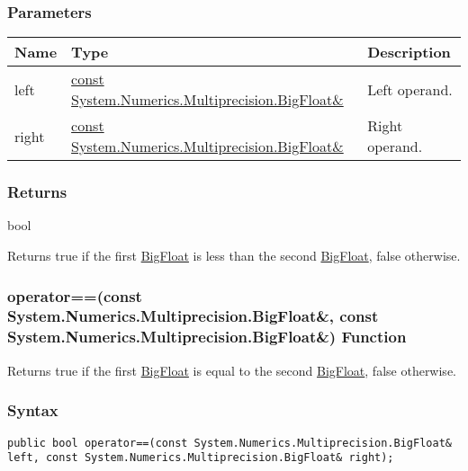 \documentclass[a4paper,oneside,11.000000pt]{book}
\begin{document}
\subsubsection*{Parameters}
\begin{flushleft}
\begin{supertabular}[l]{!{\raggedright}p{1.30721cm}!{\raggedright}p{8.55945cm}!{\raggedright}p{3.66839cm}}
\textbf{Name}
& \textbf{Type}
& \textbf{Description}
\\
\hline
left
& \hyperlink{System.Numerics.Multiprecision.BigFloat}{const System.\-Numerics.\-Multiprecision.\-BigFloat\&\-}
& Left operand.

\\
right
& \hyperlink{System.Numerics.Multiprecision.BigFloat}{const System.\-Numerics.\-Multiprecision.\-BigFloat\&\-}
& Right operand.

\\
\end{supertabular}

\end{flushleft}
\subsubsection*{Returns}bool
\begin{flushleft}
Returns true if the first \hyperlink{System.Numerics.Multiprecision.BigFloat}{BigFloat} is less than the second \hyperlink{System.Numerics.Multiprecision.BigFloat}{BigFloat}, false otherwise.

\end{flushleft}
\clearpage

\hypertarget{System.Numerics.Multiprecision.operator.equal.C.R.System.Numerics.Multiprecision.BigFloat.C.R.System.Numerics.Multiprecision.BigFloat}{\subsubsection*{operator==(const System.Numerics.Multiprecision.BigFloat\&, const System.Numerics.Multiprecision.BigFloat\&) Function}}
\begin{flushleft}
Returns true if the first \hyperlink{System.Numerics.Multiprecision.BigFloat}{BigFloat} is equal to the second \hyperlink{System.Numerics.Multiprecision.BigFloat}{BigFloat}, false otherwise.

\end{flushleft}
\subsubsection*{Syntax}
\texttt{public bool operator==(const System.Numerics.Multiprecision.BigFloat\& left, const System.Numerics.Multiprecision.BigFloat\& right);}
\end{document}
